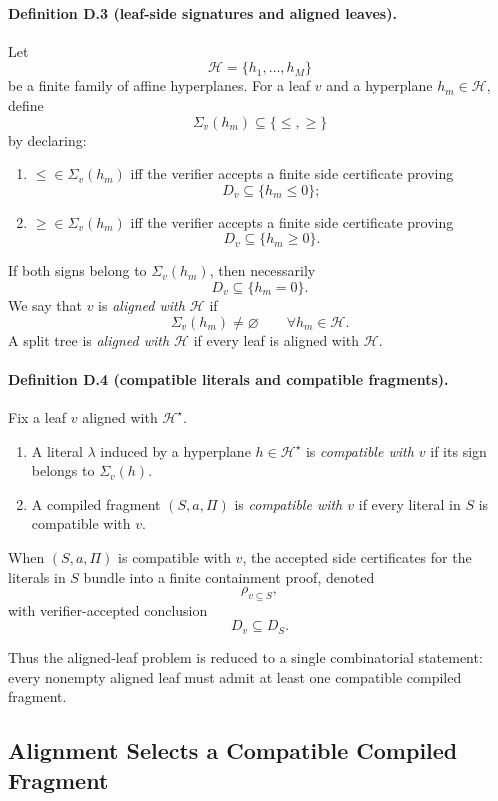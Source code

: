 \paragraph{Definition D.3 (leaf-side signatures and aligned leaves).}
Let
\[
 \mathcal H=\{h_1,\dots,h_M\}
\]
be a finite family of affine hyperplanes. For a leaf $v$ and a hyperplane $h_m\in\mathcal H$, define
\[
 \Sigma_v(h_m)\subseteq\{\le,\ge\}
\]
by declaring:
\begin{enumerate}
    \item $\le\in \Sigma_v(h_m)$ iff the verifier accepts a finite side certificate proving
    \[
    D_v\subseteq\{h_m\le 0\};
    \]
    \item $\ge\in \Sigma_v(h_m)$ iff the verifier accepts a finite side certificate proving
    \[
    D_v\subseteq\{h_m\ge 0\}.
    \]
\end{enumerate}
If both signs belong to $\Sigma_v(h_m)$, then necessarily
\[
 D_v\subseteq\{h_m=0\}.
\]
We say that $v$ is \emph{aligned with $\mathcal H$} if
\[
 \Sigma_v(h_m)\neq\varnothing
 \qquad
 \forall h_m\in\mathcal H.
\]
A split tree is \emph{aligned with $\mathcal H$} if every leaf is aligned with $\mathcal H$.

\paragraph{Definition D.4 (compatible literals and compatible fragments).}
Fix a leaf $v$ aligned with $\mathcal H^\star$.
\begin{enumerate}
    \item A literal $\lambda$ induced by a hyperplane $h\in\mathcal H^\star$ is \emph{compatible with $v$} if its sign belongs to $\Sigma_v(h)$.
    \item A compiled fragment $(S,a,\Pi)$ is \emph{compatible with $v$} if every literal in $S$ is compatible with $v$.
\end{enumerate}
When $(S,a,\Pi)$ is compatible with $v$, the accepted side certificates for the literals in $S$ bundle into a finite containment proof, denoted
\[
 \rho_{v\subseteq S},
\]
with verifier-accepted conclusion
\[
 D_v\subseteq D_S.
\tag{D.1}
\]

Thus the aligned-leaf problem is reduced to a single combinatorial statement: every nonempty aligned leaf must admit at least one compatible compiled fragment.

\subsection{Alignment Selects a Compatible Compiled Fragment}

